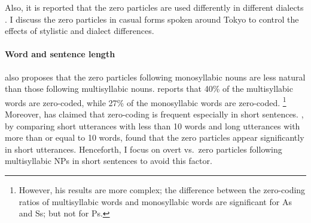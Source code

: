 %
%
Also, it is reported that
the zero particles are used differently in different dialects \cite[e.g.,][]{sasaki06,nakagawa13m}.
%
I discuss the zero particles in casual forms spoken around Tokyo
to control the effects of stylistic and dialect differences.

\paragraph{Word and sentence length}

 also proposes that
the zero particles following monosyllabic nouns are less natural than
those following multisyllabic nouns.
%
 reports that
40\% of the multisyllabic words are zero-coded,
while 27\% of the monosyllabic words are zero-coded.%
 \footnote{
 However, his results are more complex;
 the difference between the zero-coding ratios of multisyllabic words
 and monosyllabic words are significant for As and Ss;
 but not for Ps.
 }
Moreover,
 has claimed that
zero-coding is frequent especially in short sentences.
,
by comparing short utterances with less than 10 words and
long utterances with more than or equal to 10 words,
found that the zero particles appear significantly in short utterances.
%
Henceforth, I focus on overt vs.~zero particles following multisyllabic NPs in short sentences to avoid this factor.

